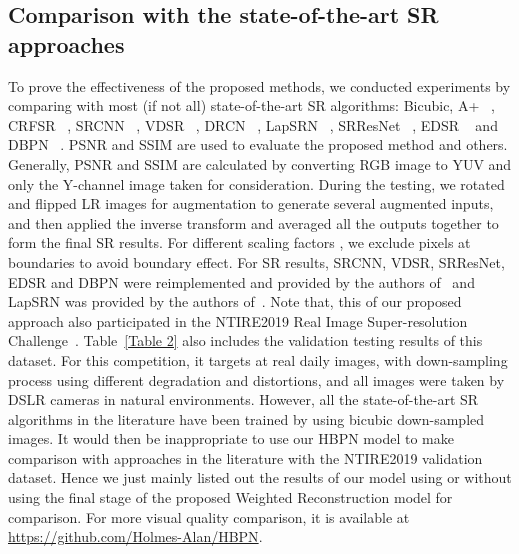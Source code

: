 \documentclass[10pt,twocolumn,letterpaper]{article}
\begin{document}
\subsection{Comparison with the state-of-the-art SR approaches}
To prove the effectiveness of the proposed methods, we conducted experiments by comparing with most (if not all) state-of-the-art SR algorithms: Bicubic, A+ ~\cite{Timofte2015}, CRFSR ~\cite{ICIP18}, SRCNN ~\cite{SRCNN}, VDSR ~\cite{VDSR}, DRCN ~\cite{DRCN}, LapSRN ~\cite{LapSRN}, SRResNet ~\cite{SRGAN}, EDSR ~\cite{EDSR} and DBPN ~\cite{DBPN}. PSNR and SSIM are used to evaluate the proposed method and others. Generally, PSNR and SSIM are calculated by converting RGB image to YUV and only the Y-channel image taken for consideration. During the testing, we rotated and flipped LR images for augmentation to generate several augmented inputs, and then applied the inverse transform and averaged all the outputs together to form the final SR results. For different scaling factors , we exclude  pixels at boundaries to avoid boundary effect. For SR results, SRCNN, VDSR, SRResNet, EDSR and DBPN were reimplemented and provided by the authors of~\cite{DBPN} and LapSRN was provided by the authors of~\cite{LapSRN}. Note that, this of our proposed approach also participated in the NTIRE2019 Real Image Super-resolution Challenge~\cite{NTIRE2019}. Table~\ref{Table 2} also includes the validation testing results of this dataset. For this competition, it targets at real daily images, with down-sampling process using different degradation and distortions, and all images were taken by DSLR cameras in natural environments. However, all the state-of-the-art SR algorithms in the literature have been trained by using bicubic down-sampled images. It would then be inappropriate to use our HBPN model to make comparison with approaches in the literature with the NTIRE2019 validation dataset. Hence we just mainly listed out the results of our model using or without using the final stage of the proposed Weighted Reconstruction model for comparison. For more visual quality comparison, it is available at \url{https://github.com/Holmes-Alan/HBPN}.
\end{document}
